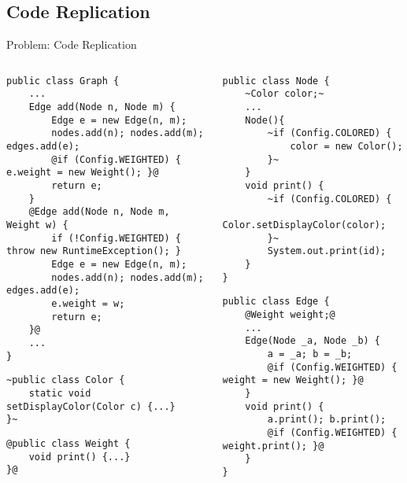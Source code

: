 \subsection{Code Replication}
\begin{frame}[fragile]{Problem: Code Replication }
		\begin{columns}
\begin{tiny}
\begin{lstlisting}
public class Graph {
	...
	Edge add(Node n, Node m) {
		Edge e = new Edge(n, m);
		nodes.add(n); nodes.add(m); edges.add(e);
		@if (Config.WEIGHTED) { e.weight = new Weight(); }@
		return e;
	}
	@Edge add(Node n, Node m, Weight w) {
		if (!Config.WEIGHTED) { throw new RuntimeException(); }
		Edge e = new Edge(n, m);
		nodes.add(n); nodes.add(m); edges.add(e);
		e.weight = w;
		return e;
	}@
	...
}
\end{lstlisting}
\begin{lstlisting}
~public class Color {
	static void setDisplayColor(Color c) {...}
}~
\end{lstlisting}
\begin{lstlisting}
@public class Weight {
	void print() {...}
}@
\end{lstlisting}
\end{tiny}	
\begin{tiny}
\begin{lstlisting}
public class Node {
	~Color color;~
	...
	Node(){
		~if (Config.COLORED) { 
			color = new Color(); 
		}~
	}
	void print() {
		~if (Config.COLORED) { 
			Color.setDisplayColor(color); 
		}~
		System.out.print(id);
	}
}
\end{lstlisting}
\begin{lstlisting}
public class Edge {
	@Weight weight;@
	...
	Edge(Node _a, Node _b) {
		a = _a; b = _b;
		@if (Config.WEIGHTED) { weight = new Weight(); }@
	}
	void print() {
		a.print(); b.print();
		@if (Config.WEIGHTED) { weight.print(); }@
	}
}
\end{lstlisting}
\end{tiny}	
		\end{columns}
\end{frame}